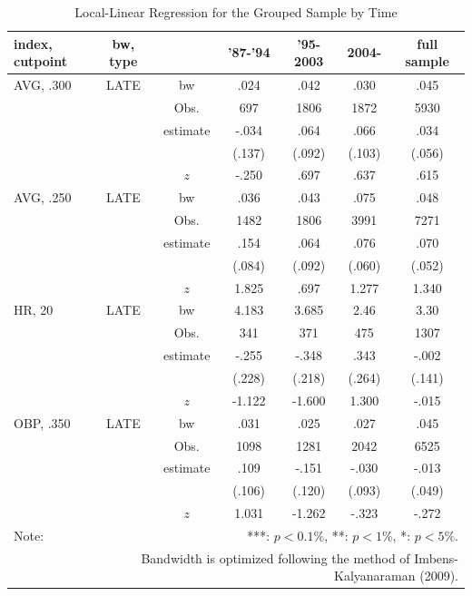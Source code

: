 \documentclass[dvipdfmx, 12pt]{article}
\begin{document}
\begin{table}[H]
  \centering
  \caption{Local-Linear Regression for the Grouped Sample by Time}
  \label{RDD_Era}
  \footnotesize
  \begin{tabular}{lcccccc} \hline
    index, cutpoint & bw, type &  &'87-'94 & '95-2003 & 2004- &full sample \\ \hline \hline
    AVG, .300 & LATE & bw & .024 & .042 & .030 & .045 \\
    &  & Obs. & 697 & 1806 & 1872 & 5930 \\
    &  & estimate & -.034 & .064 & .066 & .034 \\
    &  & & (.137) & (.092) & (.103) & (.056) \\
    & & $z$ & -.250 & .697 & .637 & .615 \\ \hline
    AVG, .250 & LATE & bw & .036 & .043 &.075 & .048 \\
    &  & Obs. & 1482 & 1806 & 3991 & 7271 \\
    &  & estimate & .154 & .064 & .076 & .070 \\
    &  & & (.084) & (.092) & (.060) & (.052) \\
    & & $z$ & 1.825 & .697 & 1.277 & 1.340 \\ \hline
    HR, 20 & LATE & bw & 4.183 & 3.685 & 2.46 & 3.30 \\
    &  & Obs. & 341 & 371 & 475 & 1307 \\
    &  & estimate & -.255 & -.348 & .343 & -.002 \\
    &  & & (.228) & (.218) & (.264) & (.141) \\
    & & $z$ & -1.122 & -1.600 & 1.300 & -.015 \\ \hline
    OBP, .350 & LATE & bw & .031 & .025 & .027 & .045 \\
    &  & Obs. & 1098 & 1281 & 2042 & 6525 \\
    &  & estimate & .109 & -.151 & -.030 & -.013 \\
    &  & & (.106) & (.120) & (.093) & (.049) \\
    & & $z$ & 1.031 & -1.262 & -.323 & -.272 \\ \hline
    Note: & \multicolumn{6}{r}{***: $p<0.1\%$, **: $p<1\%$, *: $p<5\%$.} \\
    & \multicolumn{6}{r}{Bandwidth is optimized following the method of Imbens-Kalyanaraman (2009).}
  \end{tabular}
\end{table}
\end{document}
